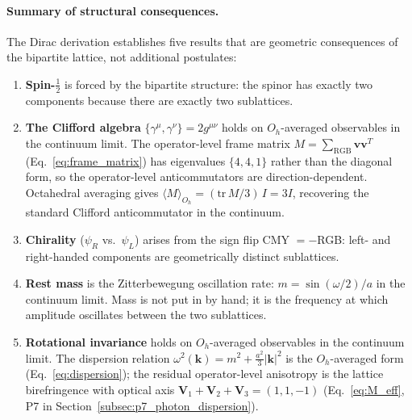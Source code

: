 \paragraph{Summary of structural consequences.}
The Dirac derivation establishes five results that are geometric
consequences of the bipartite lattice, not additional postulates:
\begin{enumerate}
\item \textbf{Spin-$\tfrac{1}{2}$} is forced by the bipartite structure:
    the spinor has exactly two components because there are exactly two
    sublattices.
\item \textbf{The Clifford algebra} $\{\gamma^\mu,\gamma^\nu\} = 2g^{\mu\nu}$
    holds on $O_h$-averaged observables in the continuum limit.  The
    operator-level frame matrix
    $M = \sum_\text{RGB}\mathbf{v}\mathbf{v}^T$
    (Eq.~\ref{eq:frame_matrix}) has eigenvalues $\{4, 4, 1\}$ rather
    than the diagonal form, so the operator-level anticommutators are
    direction-dependent.  Octahedral averaging gives
    $\langle M\rangle_{O_h} = (\mathrm{tr}\,M/3)\,I = 3I$, recovering
    the standard Clifford anticommutator in the continuum.
\item \textbf{Chirality} ($\psi_R$ vs.\ $\psi_L$) arises from the sign
    flip CMY $= -$RGB: left- and right-handed components are geometrically
    distinct sublattices.
\item \textbf{Rest mass} is the Zitterbewegung oscillation rate:
    $m = \sin(\omega/2)/a$ in the continuum limit.  Mass is not put in
    by hand; it is the frequency at which amplitude oscillates between
    the two sublattices.
\item \textbf{Rotational invariance} holds on $O_h$-averaged
    observables in the continuum limit.  The dispersion relation
    $\omega^2(\mathbf{k}) = m^2 + \tfrac{a^2}{3}|\mathbf{k}|^2$ is the
    $O_h$-averaged form (Eq.~\ref{eq:dispersion}); the residual
    operator-level anisotropy is the lattice birefringence with
    optical axis $\mathbf{V}_1+\mathbf{V}_2+\mathbf{V}_3 = (1,1,-1)$
    (Eq.~\ref{eq:M_eff}, P7 in
    Section~\ref{subsec:p7_photon_dispersion}).
\end{enumerate}

